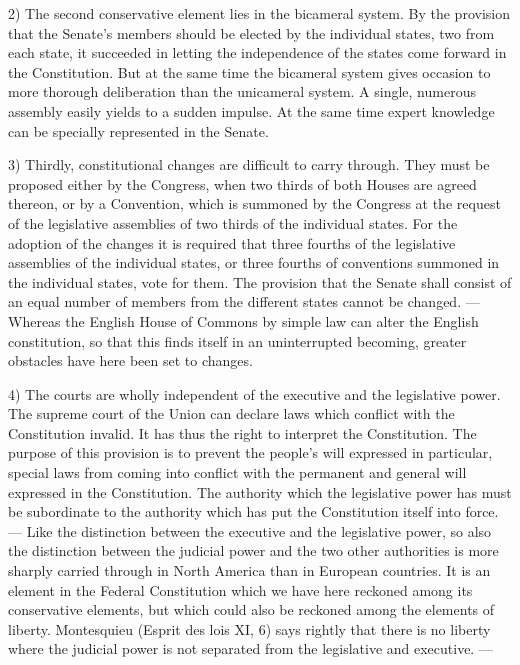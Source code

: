 \documentclass[12pt,a4paper,openany]{book}
\newcommand{\opage}[1]{\marginnote{\footnotesize\textit{[#1]}}}
\begin{document}
2) The second conservative element lies in
the bicameral system. By the provision that the Senate's members
should be elected by the individual states, two from each state, it succeeded
in letting the independence of the states come forward in the
Constitution. But at the same time the bicameral system gives occasion to
more thorough deliberation than the unicameral system. A single,
numerous assembly easily yields to a sudden impulse.
At the same time expert knowledge can be specially represented in the Senate.

3) Thirdly, constitutional changes are
difficult to carry through. They must be proposed either by the Congress,
when two thirds of both Houses are agreed thereon, or by
a Convention, which is summoned by the Congress at the request
of the legislative assemblies of two thirds of the individual states.
For the adoption of the changes it is required that three fourths
of the legislative assemblies of the individual states, or three
fourths of conventions summoned in the individual states, vote
for them. The provision that the Senate shall consist of an equal
number of members from the different states cannot be
changed. --- Whereas the English House of Commons by simple law
can alter the English constitution, so that this finds itself
in an uninterrupted becoming, greater obstacles have here been set
to changes.

4) The courts are wholly independent of the executive and
the legislative power. The supreme court of the Union can declare
laws which conflict with the Constitution invalid. It has
thus the right to interpret the Constitution. The purpose of
\opage{138}this provision is to prevent the people's will expressed in particular, special
laws from coming into conflict with the permanent and general will
expressed in the Constitution. The
authority which the legislative power has must be
subordinate to the authority which has put the Constitution itself into
force. --- Like the distinction between the executive and the
legislative power, so also the distinction between the
judicial power and the two other authorities is more sharply
carried through in North America than in European countries. It is an
element in the Federal Constitution which we have here reckoned among
its conservative elements, but which could also be reckoned
among the elements of liberty. Montesquieu (Esprit des lois XI, 6)
says rightly that there is no liberty where the judicial
power is not separated from the legislative and executive. ---
\end{document}

